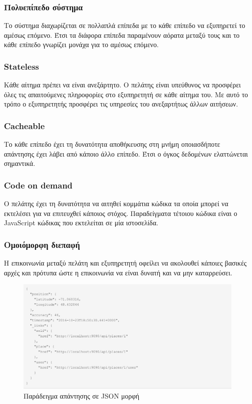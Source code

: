 \subsubsection{Πολυεπίπεδο σύστημα}
Το σύστημα διαχωρίζεται σε πολλαπλά επίπεδα με το κάθε επίπεδο να εξυπηρετεί το αμέσως επόμενο. Έτσι τα διάφορα επίπεδα παραμένουν αόρατα μεταξύ τους και το κάθε επίπεδο γνωρίζει μονάχα για το αμέσως επόμενο. 

\subsubsection{Stateless}
Κάθε αίτημα πρέπει να είναι ανεξάρτητο. Ο πελάτης είναι υπεύθυνος να προσφέρει όλες τις απαιτούμενες πληροφορίες στο εξυπηρετητή σε κάθε αίτημα του. Με αυτό το τρόπο ο εξυπηρετητής προσφέρει τις υπηρεσίες του ανεξαρτήτως άλλων αιτήσεων.

\subsubsection{Cacheable}
Το κάθε επίπεδο έχει τη δυνατότητα αποθήκευσης στη μνήμη οποιασδήποτε απάντησης έχει λάβει από κάποιο άλλο επίπεδο. Έτσι ο όγκος δεδομένων ελαττώνεται σημαντικά.

\subsubsection{Code on demand}
Ο πελάτης έχει τη δυνατότητα να αιτηθεί κομμάτια κώδικα τα οποία μπορεί να εκτελέσει για να επιτευχθεί κάποιος στόχος. Παραδείγματα τέτοιου κώδικα είναι ο JavaScript κώδικας που εκτελείται σε μία ιστοσελίδα.

\subsubsection{Ομοιόμορφη διεπαφή}
Η επικοινωνία μεταξύ πελάτη και εξυπηρετητή οφείλει να ακολουθεί κάποιες βασικές αρχές και πρότυπα ώστε η επικοινωνία να είναι δυνατή και να μην καταρρεύσει.

\begin{figure}[h]
  \centering
  \includegraphics[width=140mm]{images/request.png}
  \caption{Παράδειγμα απάντησης σε JSON μορφή}
  \label{fig:request}
\end{figure}

